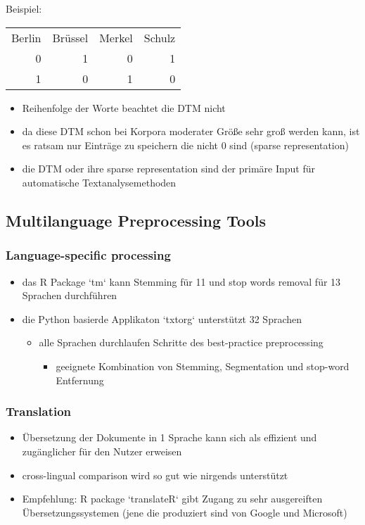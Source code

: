\documentclass[11pt]{article}
\begin{document}
Beispiel:
\begin{center}
\begin{tabular}{rrrr}
Berlin & Brüssel & Merkel & Schulz\\
0 & 1 & 0 & 1\\
1 & 0 & 1 & 0\\
\end{tabular}
\end{center}

\begin{itemize}
\item Reihenfolge der Worte beachtet die DTM nicht
\item da diese DTM schon bei Korpora moderater Größe sehr groß werden kann, ist es ratsam nur Einträge zu speichern die nicht 0 sind (sparse representation)
\item die DTM oder ihre sparse representation sind der primäre Input für automatische Textanalysemethoden
\end{itemize}
\subsection{Multilanguage Preprocessing Tools}
\label{sec:org35cf0ba}
\subsubsection{Language-specific processing}
\label{sec:orgae7009f}
\begin{itemize}
\item das R Package `tm` kann Stemming für 11 und stop words removal für 13 Sprachen durchführen
\item die Python basierde Applikaton `txtorg` unterstützt 32 Sprachen
\begin{itemize}
\item alle Sprachen durchlaufen Schritte des best-practice preprocessing
\begin{itemize}
\item geeignete Kombination von Stemming, Segmentation und stop-word Entfernung
\end{itemize}
\end{itemize}
\end{itemize}
\subsubsection{Translation}
\label{sec:org9c402a9}
\begin{itemize}
\item Übersetzung der Dokumente in 1 Sprache kann sich als effizient und zugänglicher für den Nutzer erweisen
\item cross-lingual comparison wird so gut wie nirgends unterstützt
\item Empfehlung: R package `translateR` gibt Zugang zu sehr ausgereiften Übersetzungssystemen (jene die produziert sind von Google und Microsoft)
\end{itemize}
\end{document}

